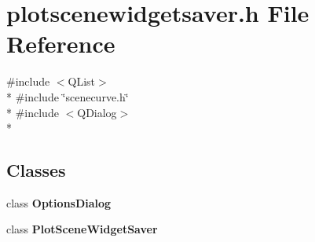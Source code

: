 \section{plotscenewidgetsaver.\+h File Reference}
\label{plotsaver_2plotscenewidgetsaver_8h}
{\ttfamily \#include $<$Q\+List$>$}\\*
{\ttfamily \#include \char`\"{}scenecurve.\+h\char`\"{}}\\*
{\ttfamily \#include $<$Q\+Dialog$>$}\\*
\subsection*{Classes}
\begin{DoxyCompactItemize}
\item 
class {\bf Options\+Dialog}
\item 
class {\bf Plot\+Scene\+Widget\+Saver}
\end{DoxyCompactItemize}
